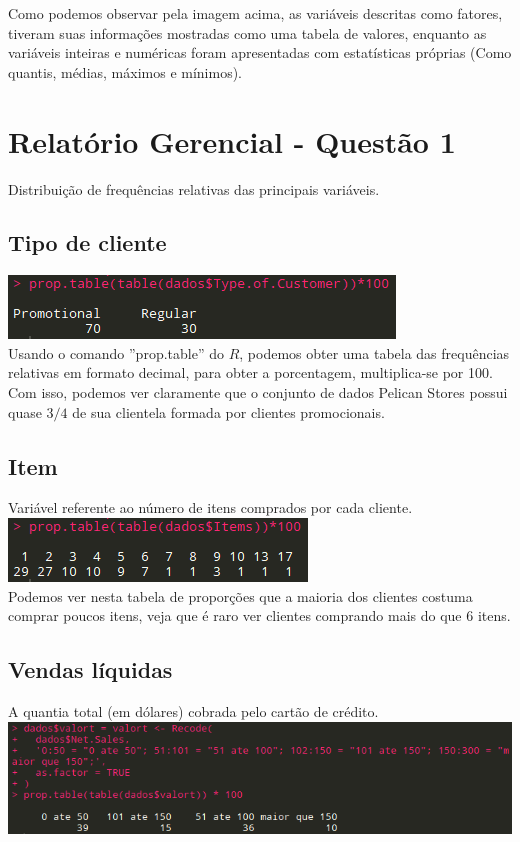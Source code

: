 \documentclass[a4paper,12pt]{article}
\begin{document}
Como podemos observar pela imagem acima, as variáveis descritas como fatores, tiveram suas informações mostradas como uma tabela de valores, enquanto as variáveis inteiras e numéricas foram apresentadas com estatísticas próprias (Como quantis, médias, máximos e mínimos).\\

\section{Relatório Gerencial - Questão 1}
Distribuição de frequências relativas das principais variáveis.

\subsection{Tipo de cliente}
\includegraphics[]{tipo.png}\\

Usando o comando ''prop.table'' do $R$, podemos obter uma tabela das frequências relativas em formato decimal, para obter a porcentagem, multiplica-se por 100. Com isso, podemos ver claramente que o conjunto de dados Pelican Stores possui quase $3/4$ de sua clientela formada por clientes promocionais.\\

\subsection{Item}
Variável referente ao número de itens comprados por cada cliente.\\
\includegraphics[]{item.png}\\
Podemos ver nesta tabela de proporções que a maioria dos clientes costuma comprar poucos itens, veja que é raro ver clientes comprando mais do que 6 itens.\\

\subsection{Vendas líquidas}
A quantia total (em dólares) cobrada pelo cartão de crédito.\\
\includegraphics[]{valor.png}
\end{document}
